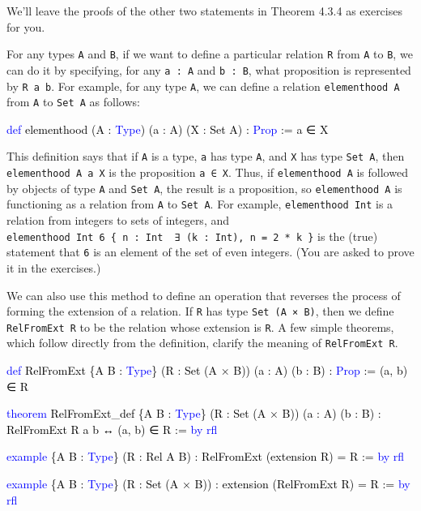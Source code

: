 \documentclass[
  letterpaper,
  DIV=11,
  numbers=noendperiod]{scrreprt}
\newenvironment{Shaded}{\begin{snugshade}}{\end{snugshade}}
\newcommand{\KeywordTok}[1]{\textcolor[rgb]{0.00,0.23,0.31}{#1}}
\newcommand{\NormalTok}[1]{\textcolor[rgb]{0.00,0.23,0.31}{#1}}
\renewcommand{\NormalTok}[1]{\textcolor[HTML]{000000}{#1}}
\renewcommand{\KeywordTok}[1]{\textcolor[HTML]{0000FF}{#1}}
\theoremstyle{remark}
\begin{document}
We'll leave the proofs of the other two statements in Theorem 4.3.4 as
exercises for you.

For any types \texttt{A} and \texttt{B}, if we want to define a
particular relation \texttt{R} from \texttt{A} to \texttt{B}, we can do
it by specifying, for any \texttt{a\ :\ A} and \texttt{b\ :\ B}, what
proposition is represented by \texttt{R\ a\ b}. For example, for any
type \texttt{A}, we can define a relation \texttt{elementhood\ A} from
\texttt{A} to \texttt{Set\ A} as follows:

\begin{Shaded}
\begin{Highlighting}[]
\KeywordTok{def}\NormalTok{ elementhood (A : }\KeywordTok{Type}\NormalTok{) (a : A) (X : Set A) : }\KeywordTok{Prop}\NormalTok{ := a ∈ X}
\end{Highlighting}
\end{Shaded}

This definition says that if \texttt{A} is a type, \texttt{a} has type
\texttt{A}, and \texttt{X} has type \texttt{Set\ A}, then
\texttt{elementhood\ A\ a\ X} is the proposition \texttt{a\ ∈\ X}. Thus,
if \texttt{elementhood\ A} is followed by objects of type \texttt{A} and
\texttt{Set\ A}, the result is a proposition, so \texttt{elementhood\ A}
is functioning as a relation from \texttt{A} to \texttt{Set\ A}. For
example, \texttt{elementhood\ Int} is a relation from integers to sets
of integers, and
\texttt{elementhood\ Int\ 6\ \{\ n\ :\ Int\ \textbar{}\ ∃\ (k\ :\ Int),\ n\ =\ 2\ *\ k\ \}}
is the (true) statement that \texttt{6} is an element of the set of even
integers. (You are asked to prove it in the exercises.)

We can also use this method to define an operation that reverses the
process of forming the extension of a relation. If \texttt{R} has type
\texttt{Set\ (A\ ×\ B)}, then we define \texttt{RelFromExt\ R} to be the
relation whose extension is \texttt{R}. A few simple theorems, which
follow directly from the definition, clarify the meaning of
\texttt{RelFromExt\ R}.

\begin{Shaded}
\begin{Highlighting}[]
\KeywordTok{def}\NormalTok{ RelFromExt \{A B : }\KeywordTok{Type}\NormalTok{\}}
\NormalTok{    (R : Set (A × B)) (a : A) (b : B) : }\KeywordTok{Prop}\NormalTok{ := (a, b) ∈ R}

\KeywordTok{theorem}\NormalTok{ RelFromExt\_def \{A B : }\KeywordTok{Type}\NormalTok{\}}
\NormalTok{    (R : Set (A × B)) (a : A) (b : B) :}
\NormalTok{    RelFromExt R a b ↔ (a, b) ∈ R := }\KeywordTok{by} \KeywordTok{rfl}

\KeywordTok{example}\NormalTok{ \{A B : }\KeywordTok{Type}\NormalTok{\} (R : Rel A B) :}
\NormalTok{    RelFromExt (extension R) = R := }\KeywordTok{by} \KeywordTok{rfl}

\KeywordTok{example}\NormalTok{ \{A B : }\KeywordTok{Type}\NormalTok{\} (R : Set (A × B)) :}
\NormalTok{    extension (RelFromExt R) = R := }\KeywordTok{by} \KeywordTok{rfl}
\end{Highlighting}
\end{Shaded}
\end{document}
